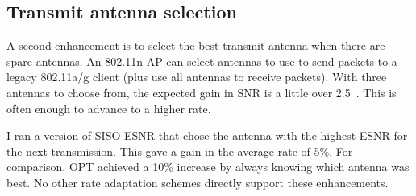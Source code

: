 \subsection{Transmit antenna selection}
A second enhancement is to select the best transmit antenna when there are spare antennas. %
An 802.11n AP can select antennas to use to send packets to a legacy 802.11a/g client (plus use all antennas to receive packets). With three antennas to choose from, the expected gain in SNR is a little over 2.5\dB~\cite{Goldsmith}. This is often enough to advance to a higher rate.

I ran a version of SISO ESNR that chose the antenna with the highest ESNR for the next transmission. This gave a gain in the average rate of 5\%.  For comparison, OPT achieved a 10\% increase by always knowing which antenna was best. No other rate adaptation schemes directly support these enhancements.

\ifx\mainfile\undefined

\fi
